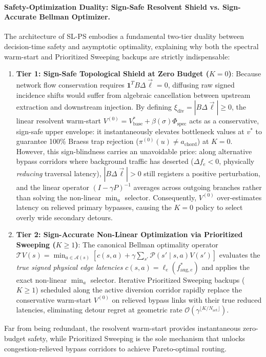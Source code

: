 \documentclass[11pt,a4paper]{article}
\begin{document}
\paragraph{Safety-Optimization Duality: Sign-Safe Resolvent Shield vs. Sign-Accurate Bellman Optimizer.}
The architecture of SL-PS embodies a fundamental two-tier duality between decision-time safety and asymptotic optimality, explaining why both the spectral warm-start and Prioritized Sweeping backups are strictly indispensable:
\begin{enumerate}
    \item \textbf{Tier 1: Sign-Safe Topological Shield at Zero Budget ($K = 0$)}: Because network flow conservation requires $\mathbf{1}^T B \Delta \vec{\ell} = 0$, diffusing raw signed incidence shifts would suffer from algebraic cancellation between upstream extraction and downstream injection. By defining $\xi_{\text{div}} = |B \Delta \vec{\ell}| \ge 0$, the linear resolvent warm-start $V^{(0)} = V_{\text{base}}^* + \beta(\sigma) \Phi_{\text{spec}}$ acts as a conservative, sign-safe upper envelope: it instantaneously elevates bottleneck values at $v^*$ to guarantee 100\% Braess trap rejection ($\pi^{(0)}(u) \ne a_{\text{chord}}$) at $K = 0$. However, this sign-blindness carries an unavoidable price: along alternative bypass corridors where background traffic has deserted ($\Delta f_e < 0$, physically \textit{reducing} traversal latency), $|B \Delta \vec{\ell}| > 0$ still registers a positive perturbation, and the linear operator $(I - \gamma P)^{-1}$ averages across outgoing branches rather than solving the non-linear $\min_a$ selector. Consequently, $V^{(0)}$ over-estimates latency on relieved primary bypasses, causing the $K=0$ policy to select overly wide secondary detours.
    \item \textbf{Tier 2: Sign-Accurate Non-Linear Optimization via Prioritized Sweeping ($K \ge 1$)}: The canonical Bellman optimality operator $\mathcal{T} V(s) = \min_{a \in \mathcal{A}(s)} [c(s, a) + \gamma \sum_{s'} \mathcal{P}(s' \mid s, a) V(s')]$ evaluates the \textit{true signed physical edge latencies} $c(s, a) = \ell_e(f_{\text{aug}, e}^*)$ and applies the exact non-linear $\min_a$ selector. Iterative Prioritized Sweeping backups ($K \ge 1$) scheduled along the active diversion corridor rapidly replace the conservative warm-start $V^{(0)}$ on relieved bypass links with their true reduced latencies, eliminating detour regret at geometric rate $\mathcal{O}(\gamma^{\lfloor K / N_{\text{act}} \rfloor})$.
\end{enumerate}
Far from being redundant, the resolvent warm-start provides instantaneous zero-budget safety, while Prioritized Sweeping is the sole mechanism that unlocks congestion-relieved bypass corridors to achieve Pareto-optimal routing.
\end{document}
